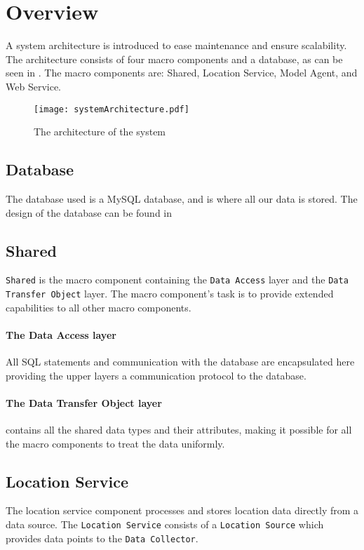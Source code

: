 \section{Overview}
A system architecture is introduced to ease maintenance and ensure scalability.
The architecture consists of four macro components and a database, as can be seen in . The macro components are: Shared, Location Service, Model Agent, and Web Service.

\begin{figure}[H]
\texttt{[image: systemArchitecture.pdf]}
\caption{The architecture of the system}
\label{fig:architecture}
\end{figure}

\subsection{Database} The database used is a MySQL database, and is where all our data is stored.
The design of the database can be found in 


\subsection{Shared}\texttt{Shared} is the macro component containing the \texttt{Data Access} layer and the \texttt{Data Transfer Object} layer.
The macro component's task is to provide extended capabilities to all other macro components.

\paragraph{The Data Access layer} All SQL statements and communication with the database are encapsulated here providing the upper layers a communication protocol to the database.

\paragraph{The Data Transfer Object layer} contains all the shared data types and their attributes, making it possible for all the macro components to treat the data uniformly.


\subsection{Location Service} 
The location service component processes and stores location data directly from a data source. 
The \texttt{Location Service} consists of a \texttt{Location Source} which provides data points to the \texttt{Data Collector}.

